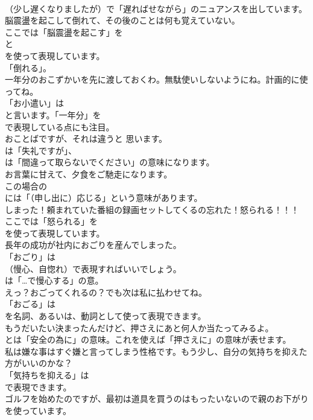 \documentclass[8pt]{extreport}
\begin{document}
\begin{CJK}{UTF8}{min}
\\	（少し遅くなりましたが）で「遅ればせながら」のニュアンスを出しています。	
\\	脳震盪を起こして倒れて、その後のことは何も覚えていない。 
\\	ここでは「脳震盪を起こす」を
\\	と
\\	を使って表現しています。
\\	「倒れる」。	
\\	一年分のおこずかいを先に渡しておくわ。無駄使いしないようにね。計画的に使ってね。 
\\	「お小遣い」は
\\	と言います。「一年分」を
\\	で表現している点にも注目。	
\\	おことばですが、それは違うと 思います。 
\\	は「失礼ですが」、
\\	は「間違って取らないでください」の意味になります。	
\\	お言葉に甘えて、夕食をご馳走になります。 
\\	この場合の
\\	には「（申し出に）応じる」という意味があります。	
\\	しまった！頼まれていた番組の録画セットしてくるの忘れた！怒られる！！！ 
\\	ここでは「怒られる」を
\\	を使って表現しています。	
\\	長年の成功が社内におごりを産んでしまった。 
\\	「おごり」は 
\\	（慢心、自惚れ）で表現すればいいでしょう。
\\	は「…で慢心する」の意。	
\\	えっ？おごってくれるの？でも次は私に払わせてね。 
\\	「おごる」は
\\	を名詞、あるいは、動詞として使って表現できます。	
\\	もうだいたい決まったんだけど、押さえにあと何人か当たってみるよ。 
\\	とは「安全の為に」の意味。これを使えば「押さえに」の意味が表せます。	
\\	私は嫌な事はすぐ嫌と言ってしまう性格です。もう少し、自分の気持ちを抑えた方がいいのかな？ 
\\	「気持ちを抑える」は
\\	で表現できます。	
\\	ゴルフを始めたのですが、最初は道具を買うのはもったいないので親のお下がりを使っています。 

\end{CJK}
\end{document}
